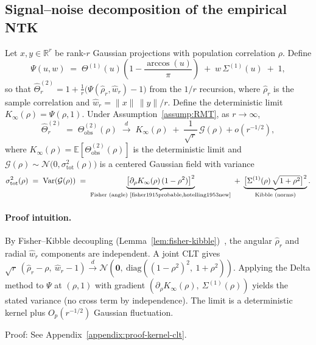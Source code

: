 \subsection{Signal–noise decomposition of the empirical NTK}
\begin{theorem}\label{thm:kernel_clt}
Let \(x, y \in \mathbb{R}^r\) be rank-\(r\) Gaussian projections with population correlation \( \rho \). Define
\[
\Psi(u,w) \;=\; \Theta^{(1)}(u)\!\left(1-\frac{\arccos(u)}{\pi}\right) \;+\; w\,\Sigma^{(1)}(u) \;+\; 1,
\]
so that \( \hat{\Theta}^{(2)}_r = 1 + \frac{1}{r}\big(\Psi(\hat{\rho}_r, \hat{w}_r) - 1\big) \) from the \( 1/r \) recursion, where \( \hat{\rho}_r \) is the sample correlation and \( \hat{w}_r = \|x\|\,\|y\|/r \). Define the deterministic limit \( K_{\infty}(\rho) = \Psi(\rho,1) \). Under Assumption~\ref{assump:RMT}, as \( r\to\infty \),
\[
\hat{\Theta}^{(2)}_r \;=\; \Theta^{(2)}_{\mathrm{obs}}(\rho) \;\xrightarrow{d}\; K_{\infty}(\rho) \;+\; \frac{1}{\sqrt{r}}\,\mathcal{G}(\rho) + o(r^{-1/2}),
\]
where \( K_{\infty}(\rho)=\mathbb{E}[\Theta^{(2)}_{\mathrm{obs}}(\rho)] \) is the deterministic limit and \( \mathcal{G}(\rho) \sim \mathcal{N}\!\big(0,\sigma_{\mathrm{tot}}^2(\rho)\big) \) is a centered Gaussian field with variance
\[
\sigma_{\mathrm{tot}}^2(\rho) \;=\; \mathrm{Var}(\mathcal{G}(\rho)) \;=\; \underbrace{\big[\partial_\rho K_{\infty}(\rho)\,(1-\rho^2)\big]^2}_{\text{Fisher (angle)~\cite{fisher1915probable,hotelling1953new}}} \;+\; \underbrace{\big[\Sigma^{(1)}(\rho)\,\sqrt{1+\rho^2}\big]^2}_{\text{Kibble (norms)}}.
\]
\end{theorem}

\paragraph{Proof intuition.}
By Fisher–Kibble decoupling (Lemma~\ref{lem:fisher-kibble})~\cite{fisher1915probable,hotelling1953new}, the angular \( \hat{\rho}_r \) and radial \( \hat{w}_r \) components are independent. A joint CLT gives \( \sqrt{r}\,(\hat{\rho}_r-\rho,\ \hat{w}_r-1) \xrightarrow{d} \mathcal{N}(\mathbf{0},\ \mathrm{diag}((1-\rho^2)^2,\ 1+\rho^2)) \). Applying the Delta method to \( \Psi \) at \( (\rho,1) \) with gradient \( (\partial_\rho K_{\infty}(\rho),\ \Sigma^{(1)}(\rho)) \) yields the stated variance (no cross term by independence). The limit is a deterministic kernel plus \( O_p(r^{-1/2}) \) Gaussian fluctuation.

Proof: See Appendix~\ref{appendix:proof-kernel-clt}.

